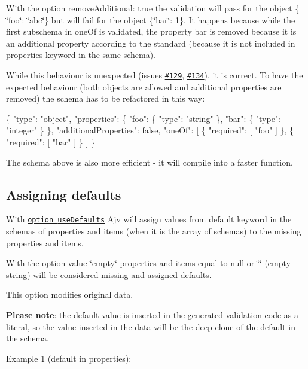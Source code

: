 With the option {\ttfamily remove\+Additional\+: true} the validation will pass for the object {\ttfamily \{ \char`\"{}foo\char`\"{}\+: \char`\"{}abc\char`\"{}\}} but will fail for the object {\ttfamily \{\char`\"{}bar\char`\"{}\+: 1\}}. It happens because while the first subschema in {\ttfamily one\+Of} is validated, the property {\ttfamily bar} is removed because it is an additional property according to the standard (because it is not included in {\ttfamily properties} keyword in the same schema).

While this behaviour is unexpected (issues \href{https://github.com/epoberezkin/ajv/issues/129}{\tt \#129}, \href{https://github.com/epoberezkin/ajv/issues/134}{\tt \#134}), it is correct. To have the expected behaviour (both objects are allowed and additional properties are removed) the schema has to be refactored in this way\+:


\begin{DoxyCode}
\{
  "type": "object",
  "properties": \{
    "foo": \{ "type": "string" \},
    "bar": \{ "type": "integer" \}
  \},
  "additionalProperties": false,
  "oneOf": [
    \{ "required": [ "foo" ] \},
    \{ "required": [ "bar" ] \}
  ]
\}
\end{DoxyCode}


The schema above is also more efficient -\/ it will compile into a faster function.

\subsection*{Assigning defaults}

With \href{#options}{\tt option {\ttfamily use\+Defaults}} Ajv will assign values from {\ttfamily default} keyword in the schemas of {\ttfamily properties} and {\ttfamily items} (when it is the array of schemas) to the missing properties and items.

With the option value {\ttfamily \char`\"{}empty\char`\"{}} properties and items equal to {\ttfamily null} or {\ttfamily \char`\"{}\char`\"{}} (empty string) will be considered missing and assigned defaults.

This option modifies original data.

{\bfseries Please note}\+: the default value is inserted in the generated validation code as a literal, so the value inserted in the data will be the deep clone of the default in the schema.

Example 1 ({\ttfamily default} in {\ttfamily properties})\+:


